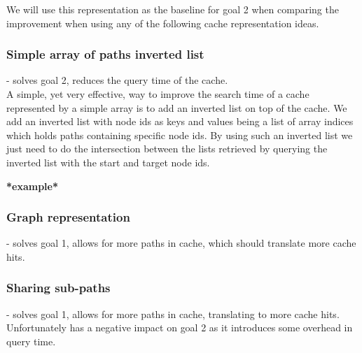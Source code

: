 We will use this representation as the baseline for goal 2 when comparing the improvement when using any of the following cache representation ideas.

\subsubsection{Simple array of paths inverted list} - solves goal 2, reduces the query time of the cache.\\
A simple, yet very effective, way to improve the search time of a cache represented by a simple array is to add an inverted list on top of the cache. We add an inverted list with node ids as keys and values being a list of array indices which holds paths containing specific node ids. By using such an inverted list we just need to do the intersection between the lists retrieved by querying the inverted list with the start and target node ids. 


\textbf{*example*}

\subsubsection{Graph representation} - solves goal 1, allows for more paths in cache, which should translate more cache hits.

\subsubsection{Sharing sub-paths} - solves goal 1, allows for more paths in cache, translating to more cache hits. Unfortunately has a negative impact on goal 2 as it introduces some overhead in query time.

